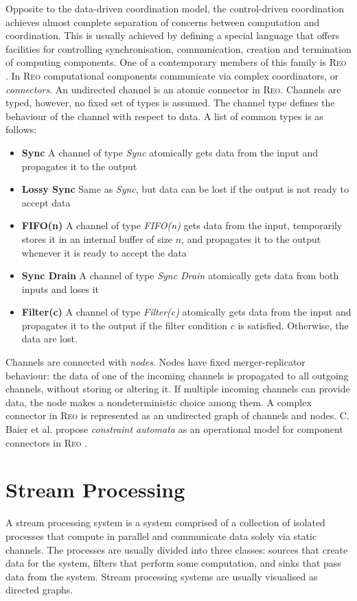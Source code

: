 Opposite to the data-driven coordination model, the control-driven coordination achieves almost complete separation of concerns between computation and coordination. This is usually achieved by defining a special language that offers facilities for controlling synchronisation, communication, creation and termination of computing components. One of a contemporary members of this family is \textsc{Reo} \cite{Reo_Arbab04}. In \textsc{Reo} computational components communicate via complex coordinators, or \emph{connectors}. An undirected channel is an atomic connector in \textsc{Reo}. Channels are typed, however, no fixed set of types is assumed. The channel type defines the behaviour of the channel with respect to data. A list of common types is as follows:
\begin{itemize}
\item \textbf{Sync} A channel of type \emph{Sync} atomically gets data from the input and propagates it to the output
\item \textbf{Lossy Sync} Same as \emph{Sync}, but data can be lost if the output is not ready to accept data
\item \textbf{FIFO(n)} A channel of type \emph{FIFO(n)} gets data from the input, temporarily stores it in an internal buffer of size $n$, and propagates it to the output whenever it is ready to accept the data
\item \textbf{Sync Drain} A channel of type \emph{Sync Drain} atomically gets data from both inputs and loses it
\item \textbf{Filter(c)} A channel of type \emph{Filter(c)} atomically gets data from the input and propagates it to the output if the filter condition $c$ is satisfied. Otherwise, the data are lost.
\end{itemize}
Channels are connected with \emph{nodes}. Nodes have fixed merger-replicator behaviour: the data of one of the incoming channels is propagated to all outgoing channels, without storing or altering it. If multiple incoming channels can provide data, the node makes a nondeterministic choice among them. A complex connector in \textsc{Reo} is represented as an undirected graph of channels and nodes. C. Baier et al. propose \emph{constraint automata} as an operational model for component connectors in \textsc{Reo} \cite{baier_ca}.


    \section{Stream Processing}
A stream processing system is a system comprised of a collection of isolated processes that compute in parallel and communicate data solely via static channels. The processes are usually divided into three classes: sources that create data for the system, filters that perform some computation, and sinks that pass data from the system. Stream processing systems are usually visualised as directed graphs.


